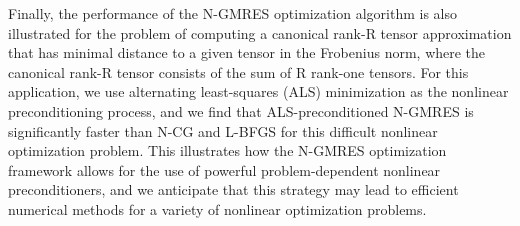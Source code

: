 \documentclass{report}
\begin{document}
Finally, the performance of the N-GMRES optimization algorithm is also
illustrated for the problem of computing a canonical rank-R tensor
approximation that has minimal distance to a given tensor in the
Frobenius norm, where the canonical rank-R tensor consists of the sum of
R rank-one tensors. For this application, we use alternating
least-squares (ALS) minimization as the nonlinear preconditioning
process, and we find that ALS-preconditioned N-GMRES is significantly
faster than N-CG and L-BFGS for this difficult nonlinear optimization
problem. This illustrates how the N-GMRES optimization framework allows
for the use of powerful problem-dependent nonlinear preconditioners, and
we anticipate that this strategy may lead to efficient numerical methods
for a variety of nonlinear optimization problems.
\end{document}
